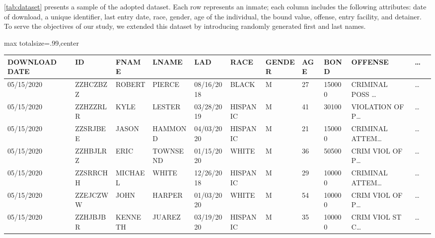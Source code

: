 \cref{tab:dataset} presents a sample of the adopted dataset. Each row represents an inmate; each column includes the following attributes: date of download, a unique identifier, last entry date, race, gender, age of the individual, the bound value, offense, entry facility, and detainer. To serve the objectives of our study, we extended this dataset by introducing randomly generated first and last names.

\begin{table*}[!t]
  \caption{Dataset sample}
  \label{tab:dataset}
  \centering
  \begin{adjustbox}{max totalsize={.99\linewidth}{\textheight},center}
    \bgroup
    \def\arraystretch{1.5}
    \begin{tabular}{|l|l|l|l|l|l|l|l|l|l|l|l|}
      \hline
      \textbf{DOWNLOAD DATE} & \textbf{ID} & \textbf{FNAME} & \textbf{LNAME} & \textbf{LAD} & \textbf{RACE} & \textbf{GENDER} & \textbf{AGE} & \textbf{BOND} & \textbf{OFFENSE}     & \textbf{\dots} \\ \hline
      05/15/2020             & ZZHCZBZZ    & ROBERT         & PIERCE         & 08/16/2018   & BLACK         & M               & 27           & 150000        & CRIMINAL POSS \dots  & \dots          \\ \hline
      05/15/2020             & ZZHZZRLR    & KYLE           & LESTER         & 03/28/2019   & HISPANIC      & M               & 41           & 30100         & VIOLATION OF P\dots  & \dots          \\ \hline
      05/15/2020             & ZZSRJBEE    & JASON          & HAMMOND        & 04/03/2020   & HISPANIC      & M               & 21           & 150000        & CRIMINAL ATTEM\dots  & \dots          \\ \hline
      05/15/2020             & ZZHBJLRZ    & ERIC           & TOWNSEND       & 01/15/2020   & WHITE         & M               & 36           & 50500         & CRIM VIOL OF P\dots  & \dots          \\ \hline
      05/15/2020             & ZZSRRCHH    & MICHAEL        & WHITE          & 12/26/2018   & HISPANIC      & M               & 29           & 100000        & CRIMINAL ATTEM\dots  & \dots          \\ \hline
      05/15/2020             & ZZEJCZWW    & JOHN           & HARPER         & 01/03/2020   & WHITE         & M               & 54           & 100000        & CRIM VIOL OF P\dots  & \dots          \\ \hline
      05/15/2020             & ZZHJBJBR    & KENNETH        & JUAREZ         & 03/19/2020   & HISPANIC      & M               & 35           & 100000        & CRIM VIOL ST C\dots  & \dots          \\ \hline

\end{tabular}
\end{adjustbox}
\end{table*}
